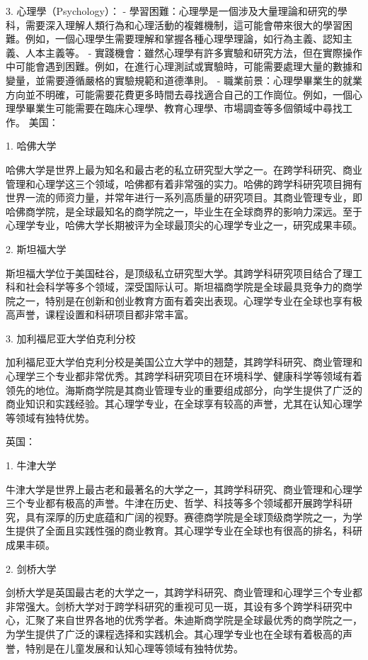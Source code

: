 \documentclass{extarticle}
\begin{document}
\begin{CJK*}{UTF8}{gbsn}
3. 心理學（Psychology）：
    - 學習困難：心理學是一個涉及大量理論和研究的學科，需要深入理解人類行為和心理活動的複雜機制，這可能會帶來很大的學習困難。例如，一個心理學生需要理解和掌握各種心理學理論，如行為主義、認知主義、人本主義等。
    - 實踐機會：雖然心理學有許多實驗和研究方法，但在實際操作中可能會遇到困難。例如，在進行心理測試或實驗時，可能需要處理大量的數據和變量，並需要遵循嚴格的實驗規範和道德準則。
    - 職業前景：心理學畢業生的就業方向並不明確，可能需要花費更多時間去尋找適合自己的工作崗位。例如，一個心理學畢業生可能需要在臨床心理學、教育心理學、市場調查等多個領域中尋找工作。
美国：

1. 哈佛大学

哈佛大学是世界上最为知名和最古老的私立研究型大学之一。在跨学科研究、商业管理和心理学这三个领域，哈佛都有着非常强的实力。哈佛的跨学科研究项目拥有世界一流的师资力量，并常年进行一系列高质量的研究项目。其商业管理专业，即哈佛商学院，是全球最知名的商学院之一，毕业生在全球商界的影响力深远。至于心理学专业，哈佛大学长期被评为全球最顶尖的心理学专业之一，研究成果丰硕。

2. 斯坦福大学

斯坦福大学位于美国硅谷，是顶级私立研究型大学。其跨学科研究项目结合了理工科和社会科学等多个领域，深受国际认可。斯坦福商学院是全球最具竞争力的商学院之一，特别是在创新和创业教育方面有着突出表现。心理学专业在全球也享有极高声誉，课程设置和科研项目都非常丰富。

3. 加利福尼亚大学伯克利分校

加利福尼亚大学伯克利分校是美国公立大学中的翘楚，其跨学科研究、商业管理和心理学三个专业都非常优秀。其跨学科研究项目在环境科学、健康科学等领域有着领先的地位。海斯商学院是其商业管理专业的重要组成部分，向学生提供了广泛的商业知识和实践经验。其心理学专业，在全球享有较高的声誉，尤其在认知心理学等领域有独特优势。

英国：

1. 牛津大学

牛津大学是世界上最古老和最著名的大学之一，其跨学科研究、商业管理和心理学三个专业都有极高的声誉。牛津在历史、哲学、科技等多个领域都开展跨学科研究，具有深厚的历史底蕴和广阔的视野。赛德商学院是全球顶级商学院之一，为学生提供了全面且实践性强的商业教育。其心理学专业在全球也有很高的排名，科研成果丰硕。

2. 剑桥大学

剑桥大学是英国最古老的大学之一，其跨学科研究、商业管理和心理学三个专业都非常强大。剑桥大学对于跨学科研究的重视可见一斑，其设有多个跨学科研究中心，汇聚了来自世界各地的优秀学者。朱迪斯商学院是全球最优秀的商学院之一，为学生提供了广泛的课程选择和实践机会。其心理学专业也在全球有着极高的声誉，特别是在儿童发展和认知心理等领域有独特优势。


\end{CJK*}
\end{document}
